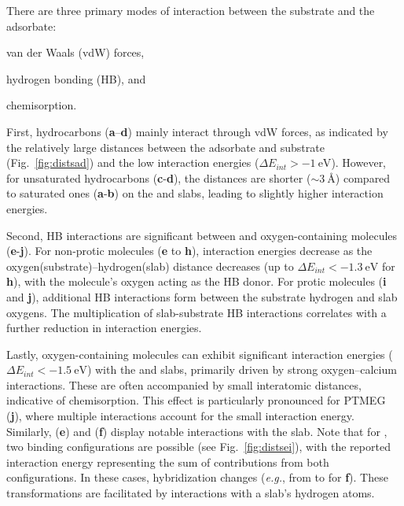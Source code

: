\documentclass[%
aip,
amsmath,amssymb,
preprint,%
jcp,
showkeys,
]{revtex4-2}
\begin{document}
\clearpage

There are three primary modes of interaction between the substrate and the adsorbate: \begin{inparaenum}[i)] \item van der Waals (vdW) forces, 
\item hydrogen bonding (HB), and 
\item chemisorption. 
\end{inparaenum}
First, hydrocarbons (\textbf{a}–\textbf{d}) mainly interact through vdW forces, as indicated by the relatively large distances between the adsorbate and substrate (Fig.~\ref{fig:distsad}) and the low interaction energies ($\Delta E_{int} > \SI{-1}{\electronvolt}$). However, for unsaturated hydrocarbons (\textbf{c}-\textbf{d}), the distances are shorter ($\sim\SI{3}{\angstrom}$) compared to saturated ones (\textbf{a}-\textbf{b}) on the  and  slabs, leading to slightly higher interaction energies.

Second, HB interactions are significant between  and oxygen-containing mole\-cules (\textbf{e}-\textbf{j}). For non-protic molecules (\textbf{e} to \textbf{h}), interaction energies decrease as the oxygen(substrate)--hydrogen(slab) distance decreases (up to $\Delta E_{int}<\SI{-1.3}{\electronvolt}$ for \textbf{h}), with the molecule's oxygen acting as the HB donor. For protic molecules (\textbf{i} and \textbf{j}), additional HB interactions form between the substrate hydrogen and slab oxygens. The multiplication of slab-substrate HB interactions correlates with a further reduction in interaction energies.


Lastly, oxygen-containing molecules can exhibit significant interaction energies ($\Delta E_{int} < \SI{-1.5}{\electronvolt}$) with the  and  slabs, primarily driven by strong oxygen--calcium interactions. These are often accompanied by small interatomic distances, indicative of chemisorption. This effect is particularly pronounced for PTMEG (\textbf{j}), where multiple interactions account for the small interaction energy. Similarly,  (\textbf{e}) and  (\textbf{f}) display notable interactions with the  slab. Note that for , two binding configurations are possible (see Fig.~\ref{fig:distsei}), with the reported interaction energy representing the sum of contributions from both configurations. In these cases, hybridization changes (\textit{e.g.}, from  to  for \textbf{f}). These transformations are facilitated by interactions with a slab’s hydrogen atoms.
\end{document}
